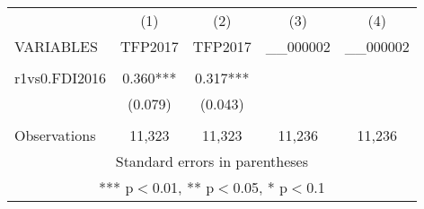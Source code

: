 \documentclass[]{article}
\begin{document}
\begin{tabular}{lcccc} \hline
 & (1) & (2) & (3) & (4) \\
VARIABLES & TFP2017 & TFP2017 & \_\_000002 & \_\_000002 \\ \hline
 &  &  &  &  \\
r1vs0.FDI2016 & 0.360*** & 0.317*** &  &  \\
 & (0.079) & (0.043) &  &  \\
 &  &  &  &  \\
 Observations & 11,323 & 11,323 & 11,236 & 11,236 \\ \hline
\multicolumn{5}{c}{ Standard errors in parentheses} \\
\multicolumn{5}{c}{ *** p$<$0.01, ** p$<$0.05, * p$<$0.1} \\
\end{tabular}
\end{document}
